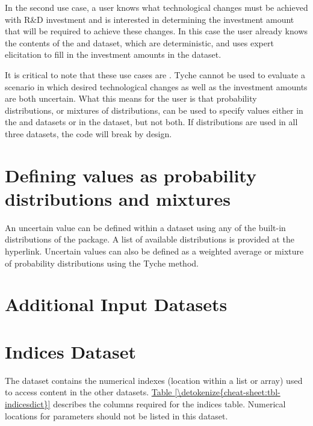 \documentclass[letterpaper,10pt,english]{sphinxmanual}
\begin{document}
In the second use case, a user knows what technological changes must be achieved with R\&D investment and is interested in determining the investment amount that will be required to achieve these changes. In this case the user already knows the contents of the  and  dataset, which are deterministic, and uses expert elicitation to fill in the investment amounts in the  dataset.

It is critical to note that these use cases are . Tyche cannot be used to evaluate a scenario in which desired technological changes as well as the investment amounts are both uncertain. What this means for the user is that probability distributions, or mixtures of distributions, can be used to specify values either in the  and  datasets or in the  dataset, but not both. If distributions are used in all three datasets, the code will break by design.


\section{Defining values as probability distributions and mixtures}
\label{\detokenize{cheat-sheet:defining-values-as-probability-distributions-and-mixtures}}
An uncertain value can be defined within a dataset using any of the built-in distributions of the  package. A list of available distributions is provided at the hyperlink. Uncertain values can also be defined as a weighted average or mixture of probability distributions using the Tyche  method.


\section{Additional Input Datasets}
\label{\detokenize{cheat-sheet:additional-input-datasets}}

\section{Indices Dataset}
\label{\detokenize{cheat-sheet:indices-dataset}}
The  dataset contains the numerical indexes (location within a list or array) used to access content in the other datasets. \hyperref[\detokenize{cheat-sheet:tbl-indicesdict}]{Table \ref{\detokenize{cheat-sheet:tbl-indicesdict}}} describes the columns required for the indices table. Numerical locations for parameters should not be listed in this dataset.
\end{document}
